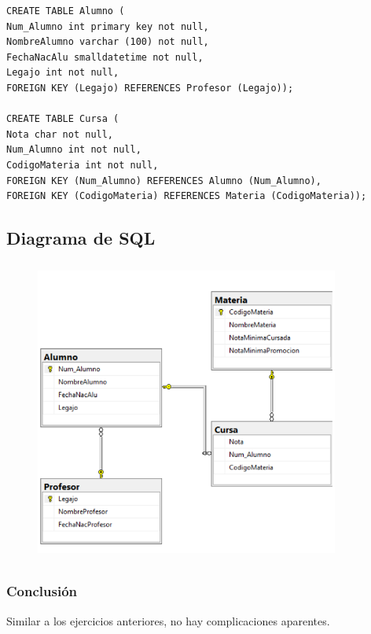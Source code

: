 \documentclass[a4paper, 12pt]{article}
\begin{document}
\begin{justify}
\begin{verbatim}
CREATE TABLE Alumno (
Num_Alumno int primary key not null,
NombreAlumno varchar (100) not null,
FechaNacAlu smalldatetime not null,
Legajo int not null,
FOREIGN KEY (Legajo) REFERENCES Profesor (Legajo));

CREATE TABLE Cursa (
Nota char not null,
Num_Alumno int not null,
CodigoMateria int not null,
FOREIGN KEY (Num_Alumno) REFERENCES Alumno (Num_Alumno),
FOREIGN KEY (CodigoMateria) REFERENCES Materia (CodigoMateria));
\end{verbatim}
        \subsection{Diagrama de SQL}
        \begin{figure}[H]
            \centering
            \includegraphics[width=10cm,height=10cm]{sql_u5t3_2.PNG}
        \end{figure}
        \subsubsection{Conclusión}
        \justify
        Similar a los ejercicios anteriores, no hay complicaciones aparentes.

\end{justify}
\end{document}
